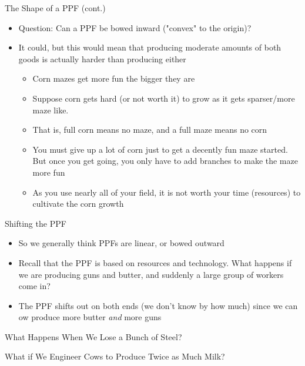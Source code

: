 \documentclass[10pt,xcolor={svgnames}]{beamer}
\begin{document}
\begin{frame}{The Shape of a PPF (cont.)}
\begin{itemize}[<+->]
    \item Question: Can a PPF be bowed inward ("convex" to the origin)?
    \item It could, but this would mean that producing moderate amounts of both goods is actually harder than producing either
    \begin{itemize}[<+->]
        \item Corn mazes get more fun the bigger they are
        \item Suppose corn gets hard (or not worth it) to grow as it gets sparser/more maze like. 
        \item That is, full corn means no maze, and a full maze means no corn
        \item You must give up a lot of corn just to get a decently fun maze started. But once you get going, you only have to add branches to make the maze more fun
        \item As you use nearly all of your field, it is not worth your time (resources) to cultivate the corn growth
    \end{itemize}
    \vspace{25mm}
\end{itemize}
\end{frame}

\begin{frame}{Shifting the PPF}
\begin{itemize}[<+->]
    \item So we generally think PPFs are linear, or bowed outward
    \item Recall that the PPF is based on resources and technology. What happens if we are producing guns and butter, and suddenly a large group of workers come in?\vspace{35mm}
    \item The PPF shifts out on both ends (we don't know by how much) since we can ow produce more butter \textit{and} more guns
\end{itemize}
\end{frame}

\begin{frame}{What Happens When We Lose a Bunch of Steel?}

\end{frame}


\begin{frame}{What if We Engineer Cows to Produce Twice as Much Milk?}

\end{frame}
\end{document}
